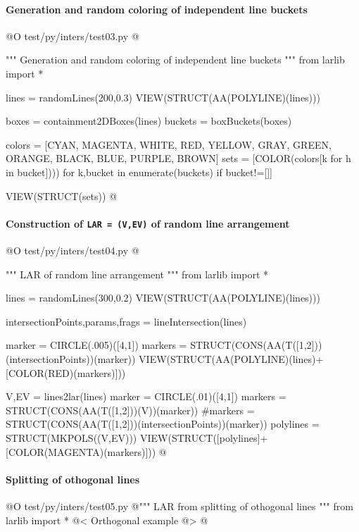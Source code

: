 \documentclass[11pt,oneside]{article}    %
\begin{document}
\paragraph{Generation and random coloring of independent line buckets}
@O test/py/inters/test03.py
@{""" Generation and random coloring of independent line buckets """
from larlib import *

lines = randomLines(200,0.3)
VIEW(STRUCT(AA(POLYLINE)(lines)))

boxes = containment2DBoxes(lines)
buckets = boxBuckets(boxes)

colors = [CYAN, MAGENTA, WHITE, RED, YELLOW, GRAY, GREEN, ORANGE, BLACK, BLUE, PURPLE, BROWN]
sets = [COLOR(colors[k%
            for h in bucket]))) for k,bucket in enumerate(buckets) if bucket!=[]]

VIEW(STRUCT(sets))
@}


\paragraph{Construction of \texttt{LAR = (V,EV)} of random line arrangement}
@O test/py/inters/test04.py
@{""" LAR of random line arrangement """
from larlib import *

lines = randomLines(300,0.2)
VIEW(STRUCT(AA(POLYLINE)(lines)))

intersectionPoints,params,frags = lineIntersection(lines)

marker = CIRCLE(.005)([4,1])
markers = STRUCT(CONS(AA(T([1,2]))(intersectionPoints))(marker))
VIEW(STRUCT(AA(POLYLINE)(lines)+[COLOR(RED)(markers)]))

V,EV = lines2lar(lines)
marker = CIRCLE(.01)([4,1])
markers = STRUCT(CONS(AA(T([1,2]))(V))(marker))
#markers = STRUCT(CONS(AA(T([1,2]))(intersectionPoints))(marker))
polylines = STRUCT(MKPOLS((V,EV)))
VIEW(STRUCT([polylines]+[COLOR(MAGENTA)(markers)]))
@}


\paragraph{Splitting of othogonal lines}
@O test/py/inters/test05.py
@{""" LAR from splitting of othogonal lines """
from larlib import *
@< Orthogonal example @>
@}
\end{document}
